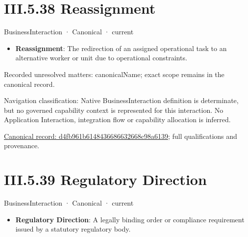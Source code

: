 \section*{III.5.38 Reassignment}
\label{navigation:III.5.38}

\label{element:d4fb961b6148436686632668c98a6139}
{\small BusinessInteraction · Canonical · current}\par

\begin{itemize}


\item \textbf{Reassignment}: The redirection of an assigned operational task to an alternative worker or unit due to operational constraints.

\end{itemize}

{\small Recorded unresolved matters: canonicalName; exact scope remains in the canonical record.}\par
{\small Navigation classification: Native BusinessInteraction definition is determinate, but no governed capability context is represented for this interaction. No Application Interaction, integration flow or capability allocation is inferred.}\par
{\footnotesize \href{../../../../continuum/business/business-interaction/d4fb961b6148436686632668c98a6139.md}{Canonical record: d4fb961b6148436686632668c98a6139}; full qualifications and provenance.}\par
\section*{III.5.39 Regulatory Direction}
\label{navigation:III.5.39}

\label{element:baf4be48ac11472aa130c71e6474d9a4}
{\small BusinessInteraction · Canonical · current}\par

\begin{itemize}


\item \textbf{Regulatory Direction}: A legally binding order or compliance requirement issued by a statutory regulatory body.

\end{itemize}

